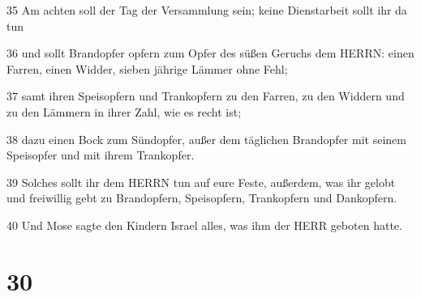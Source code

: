 \par 35 Am achten soll der Tag der Versammlung sein; keine Dienstarbeit sollt ihr da tun
\par 36 und sollt Brandopfer opfern zum Opfer des süßen Geruchs dem HERRN: einen Farren, einen Widder, sieben jährige Lämmer ohne Fehl;
\par 37 samt ihren Speisopfern und Trankopfern zu den Farren, zu den Widdern und zu den Lämmern in ihrer Zahl, wie es recht ist;
\par 38 dazu einen Bock zum Sündopfer, außer dem täglichen Brandopfer mit seinem Speisopfer und mit ihrem Trankopfer.
\par 39 Solches sollt ihr dem HERRN tun auf eure Feste, außerdem, was ihr gelobt und freiwillig gebt zu Brandopfern, Speisopfern, Trankopfern und Dankopfern.
\par 40 Und Mose sagte den Kindern Israel alles, was ihm der HERR geboten hatte.

\chapter{30}

